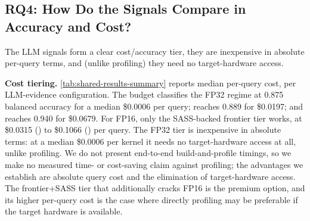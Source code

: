 \subsection{RQ4: How Do the Signals Compare in Accuracy and Cost?}

The LLM signals form a clear cost/accuracy tier, they are inexpensive in absolute per-query terms, and (unlike profiling) they need no target-hardware access.

\textbf{Cost tiering.}
\autoref{tab:shared-results-summary} reports median per-query cost, per LLM-evidence configuration.
The budget \gptoss classifies the \sourceonly FP32 regime at 0.875 balanced accuracy for a median \$0.0006 per query; \gptfivefour reaches 0.889 for \$0.0197; and \opus reaches 0.940 for \$0.0679.
For FP16, only the SASS-backed frontier tier works, at \$0.0315 (\gptfivefour) to \$0.1066 (\opus) per query.
The \sourceonly FP32 tier is inexpensive in absolute terms: at a median \$0.0006 per kernel it needs no target-hardware access at all, unlike profiling.
We do not present end-to-end build-and-profile timings, so we make no measured time- or cost-saving claim against profiling; the advantages we establish are absolute query cost and the elimination of target-hardware access.
The frontier+SASS tier that additionally cracks FP16 is the premium option, and its higher per-query cost is the case where directly profiling may be preferable if the target hardware is available.

